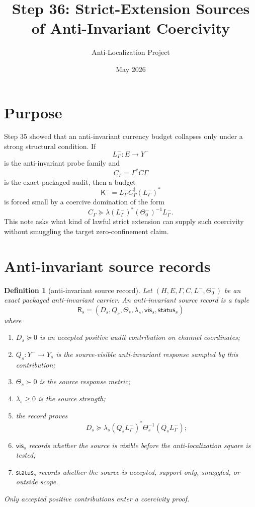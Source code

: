 \documentclass[11pt]{article}
\title{Step 36: Strict-Extension Sources of Anti-Invariant Coercivity}
\author{Anti-Localization Project}
\date{May 2026}
\newtheorem{definition}{Definition}
\begin{document}
\maketitle

\section{Purpose}
Step 35 showed that an anti-invariant currency budget collapses only under a strong structural condition.  If
\[
  L^-_\Gamma:E\to Y^-
\]
is the anti-invariant probe family and
\[
  C_\Gamma=\Gamma^*C\Gamma
\]
is the exact packaged audit, then a budget
\[
  \mathsf K^-=L^-_\Gamma C_\Gamma^\dagger (L^-_\Gamma)^*
\]
is forced small by a coercive domination of the form
\[
  C_\Gamma\succeq \lambda (L^-_\Gamma)^*(\Theta_0^-)^{-1}L^-_\Gamma.
\]
This note asks what kind of lawful strict extension can supply such coercivity without smuggling the target zero-confinement claim.

\section{Anti-invariant source records}

\begin{definition}[anti-invariant source record]
Let \((H,E,\Gamma,C,L^-,\Theta_0^-)\)
be an exact packaged anti-invariant carrier.  An anti-invariant source record is a tuple
\[
  \mathsf R_s=(D_s,Q_s,\Theta_s,\lambda_s,\mathsf{vis}_s,\mathsf{status}_s)
\]
where
\begin{enumerate}[label=(\roman*)]
  \item \(D_s\succeq0\) is an accepted positive audit contribution on channel coordinates;
  \item \(Q_s:Y^-\to Y_s\) is the source-visible anti-invariant response sampled by this contribution;
  \item \(\Theta_s\succ0\) is the source response metric;
  \item \(\lambda_s\ge0\) is the source strength;
  \item the record proves
  \[
    D_s\succeq \lambda_s (Q_sL^-_\Gamma)^*\Theta_s^{-1}(Q_sL^-_\Gamma);
  \]
  \item \(\mathsf{vis}_s\) records whether the source is visible before the anti-localization square is tested;
  \item \(\mathsf{status}_s\) records whether the source is accepted, support-only, smuggled, or outside scope.
\end{enumerate}
Only accepted positive contributions enter a coercivity proof.
\end{definition}
\end{document}
